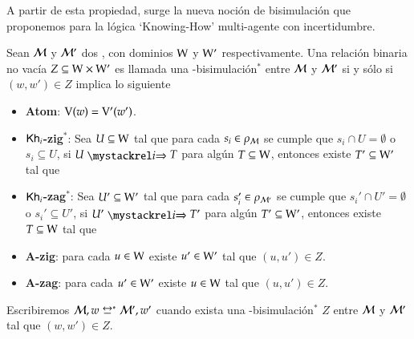 A partir de esta propiedad, surge la nueva noción de bisimulación que proponemos para la lógica `Knowing-How' multi-agente con 
incertidumbre.

\begin{definicion}\label{def:bisim_redefinition}
    Sean $\mathcal{M}$ y $\mathcal{M}'$ dos \ultss, con dominios $\mathrm{W}$ y $\mathrm{W}'$ respectivamente.
    Una relación binaria no vacía $Z \subseteq \mathrm{W} \times \mathrm{W}'$ es llamada una \KHilogic-bisimulación$^*$ entre $\mathcal{M}$ y 
    $\mathcal{M}'$ si y sólo si $(w,w') \in Z$ implica lo siguiente
    \begin{itemize}
        \item \textbf{Atom}: $\mathrm{V}(w)=\mathrm{V}'(w')$.

        \item \textbf{$\mathsf{Kh}_i$-zig$^*$}: Sea $U \subseteq \mathrm{W}$ tal que para cada $s_i \in \rho_{\mathcal{M}}$ se cumple que $s_i \cap U = \emptyset$ o $s_i \subseteq U$, si $U \ultsExecAgi T$ para algún $T \subseteq \mathrm{W}$, entonces existe $T' \subseteq \mathrm{W}'$ tal que
        \begin{multicols}{2}
        \end{multicols}
        
        \item \textbf{$\mathsf{Kh}_i$-zag$^*$}: Sea $U' \subseteq \mathrm{W}'$ tal que para cada $s_i' \in \rho_{\mathcal{M}'}$ se cumple que $s_i' \cap U' = \emptyset$ o $s_i' \subseteq U'$, si $U' \ultsExecAgi T'$ para algún $T' \subseteq \mathrm{W}'$, entonces existe $T \subseteq \mathrm{W}$ tal que
        \begin{multicols}{2}
        \end{multicols}

        \item \textbf{A-zig}: para cada $u \in \mathrm{W}$ existe $u' \in \mathrm{W}'$ tal que $(u,u') \in Z$.

        \item \textbf{A-zag}: para cada $u' \in \mathrm{W}'$ existe $u \in \mathrm{W}$ tal que $(u,u') \in Z$.
    \end{itemize} 

    Escribiremos $\modults,w \bisim^* \modults',w'$ cuando exista una \KHilogic-bisimulación$^*$ $Z$ entre
    $\mathcal{M}$ y $\mathcal{M}'$ tal que $(w,w') \in Z$.
\end{definicion}

